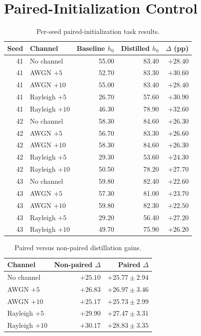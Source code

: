 \documentclass[letterpaper,journal]{IEEEtran}
\begin{document}
\FloatBarrier

\section{Paired-Initialization Control}
\label{app:paired}

\begin{table}[!t]
\centering
\caption{Per-seed paired-initialization task results.}
\scriptsize
\begin{tabular}{@{}rlrrr@{}}
\toprule
Seed & Channel & Baseline $h_0$ & Distilled $h_0$ & $\Delta$ (pp) \\ \midrule
41 & No channel & 55.00 & 83.40 & $+28.40$ \\
41 & AWGN $+5$ & 52.70 & 83.30 & $+30.60$ \\
41 & AWGN $+10$ & 55.00 & 83.40 & $+28.40$ \\
41 & Rayleigh $+5$ & 26.70 & 57.60 & $+30.90$ \\
41 & Rayleigh $+10$ & 46.30 & 78.90 & $+32.60$ \\
42 & No channel & 58.30 & 84.60 & $+26.30$ \\
42 & AWGN $+5$ & 56.70 & 83.30 & $+26.60$ \\
42 & AWGN $+10$ & 58.30 & 84.60 & $+26.30$ \\
42 & Rayleigh $+5$ & 29.30 & 53.60 & $+24.30$ \\
42 & Rayleigh $+10$ & 50.50 & 78.20 & $+27.70$ \\
43 & No channel & 59.80 & 82.40 & $+22.60$ \\
43 & AWGN $+5$ & 57.30 & 81.00 & $+23.70$ \\
43 & AWGN $+10$ & 59.80 & 82.30 & $+22.50$ \\
43 & Rayleigh $+5$ & 29.20 & 56.40 & $+27.20$ \\
43 & Rayleigh $+10$ & 49.70 & 75.90 & $+26.20$ \\ \bottomrule
\end{tabular}
\end{table}

\begin{table}[!t]
\centering
\caption{Paired versus non-paired distillation gains.}
\scriptsize
\begin{tabular}{@{}lrr@{}}
\toprule
Channel & Non-paired $\Delta$ & Paired $\Delta$ \\ \midrule
No channel & $+25.10$ & $+25.77\pm2.94$ \\
AWGN $+5$ & $+26.83$ & $+26.97\pm3.46$ \\
AWGN $+10$ & $+25.17$ & $+25.73\pm2.99$ \\
Rayleigh $+5$ & $+29.90$ & $+27.47\pm3.31$ \\
Rayleigh $+10$ & $+30.17$ & $+28.83\pm3.35$ \\ \bottomrule
\end{tabular}
\end{table}

\FloatBarrier



\end{document}

